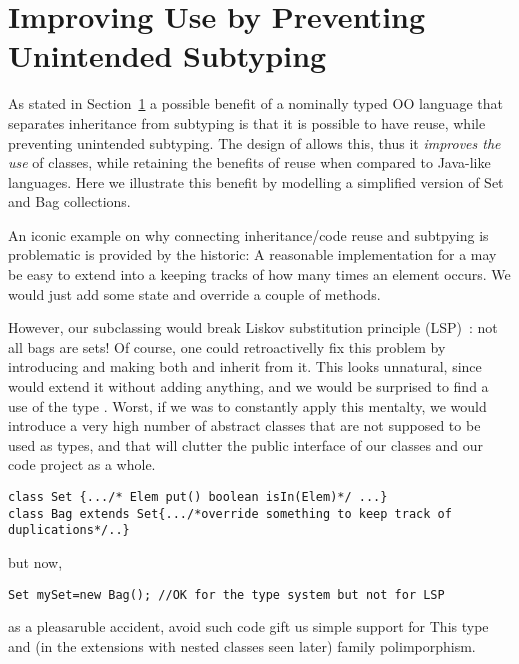 \section{Improving Use by Preventing Unintended Subtyping}
As stated in Section~\ref{} a possible benefit of a nominally typed OO language
that separates inheritance from subtyping is that it is possible to 
have reuse, while preventing unintended subtyping. The design of \name 
allows this, thus it \emph{improves the use} of classes, while
retaining the benefits of reuse when compared to Java-like languages. 
Here we illustrate this benefit by modelling a simplified version of
Set and Bag collections. 


An iconic example on why connecting inheritance/code reuse and
subtpying is problematic is provided by the
historic\cite{LaLonde:1991:SSS:110673.110679}: A reasonable
implementation for a \Q@Set@ may be easy to extend into a \Q@Bag@
keeping tracks of how many times an element occurs.  We would just add
some state and override a couple of methods.

However, our subclassing would break Liskov substitution principle (LSP)~\cite{martin2000design}: not all bags are sets!
Of course, one could retroactivelly fix this problem by introducing \Q@AbstractSetOrBag@
and making both \Q@Bag@ and \Q@Set@ inherit from it.
This looks unnatural, since \Q@Set@ would extend it without adding anything,
and we would be surprised to find a use of the type \Q@AbstractSetOrBag@.
Worst, if we was to constantly apply this mentalty, we would introduce a very high number
of abstract classes that are not supposed to be used as types, and that will clutter the 
public interface of our classes and our code project as a whole.

\begin{lstlisting}
class Set {.../* Elem put() boolean isIn(Elem)*/ ...}
class Bag extends Set{.../*override something to keep track of duplications*/..}
\end{lstlisting}

but now, 

\begin{lstlisting}
Set mySet=new Bag(); //OK for the type system but not for LSP
\end{lstlisting}

as a pleasaruble accident, avoid such code gift us simple support for
This type and (in the extensions with nested classes seen later)
family polimporphism.

